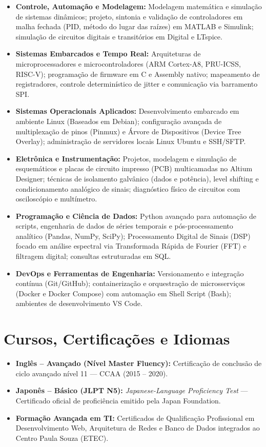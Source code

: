 \documentclass[a4paper,10pt]{article}
\begin{document}
\begin{itemize}
\setlength\itemsep{0em}
\item \textbf{Controle, Automação e Modelagem:} Modelagem matemática e simulação de sistemas dinâmicos; projeto, sintonia e validação de controladores em malha fechada (PID, método do lugar das raízes) em MATLAB e Simulink; simulação de circuitos digitais e transitórios em Digital e LTspice.
\item \textbf{Sistemas Embarcados e Tempo Real:} Arquiteturas de microprocessadores e microcontroladores (ARM Cortex-A8, PRU-ICSS, RISC-V); programação de firmware em C e Assembly nativo; mapeamento de registradores, controle determinístico de jitter e comunicação via barramento SPI.
\item \textbf{Sistemas Operacionais Aplicados:} Desenvolvimento embarcado em ambiente Linux (Baseados em Debian); configuração avançada de multiplexação de pinos (Pinmux) e Árvore de Dispositivos (Device Tree Overlay); administração de servidores locais Linux Ubuntu e SSH/SFTP.
\item \textbf{Eletrônica e Instrumentação:} Projetos, modelagem e simulação de esquemáticos e placas de circuito impresso (PCB) multicamadas no Altium Designer; técnicas de isolamento galvânico (dados e potência), level shifting e condicionamento analógico de sinais; diagnóstico físico de circuitos com osciloscópio e multímetro.
\item \textbf{Programação e Ciência de Dados:} Python avançado para automação de scripts, engenharia de dados de séries temporais e pós-processamento analítico (Pandas, NumPy, SciPy); Processamento Digital de Sinais (DSP) focado em análise espectral via Transformada Rápida de Fourier (FFT) e filtragem digital; consultas estruturadas em SQL.
\item \textbf{DevOps e Ferramentas de Engenharia:} Versionamento e integração contínua (Git/GitHub); containerização e orquestração de microsserviços (Docker e Docker Compose) com automação em Shell Script (Bash); ambientes de desenvolvimento VS Code.
\end{itemize}

\section*{Cursos, Certificações e Idiomas}

\begin{itemize}
\setlength\itemsep{0em}
\item \textbf{Inglês -- Avançado (Nível Master Fluency):} Certificação de conclusão de ciclo avançado nível 11 — CCAA (2015 -- 2020).
\item \textbf{Japonês -- Básico (JLPT N5):} \textit{Japanese-Language Proficiency Test} — Certificado oficial de proficiência emitido pela Japan Foundation.
\item \textbf{Formação Avançada em TI:} Certificados de Qualificação Profissional em Desenvolvimento Web, Arquitetura de Redes e Banco de Dados integrados ao Centro Paula Souza (ETEC).
\end{itemize}
\end{document}
